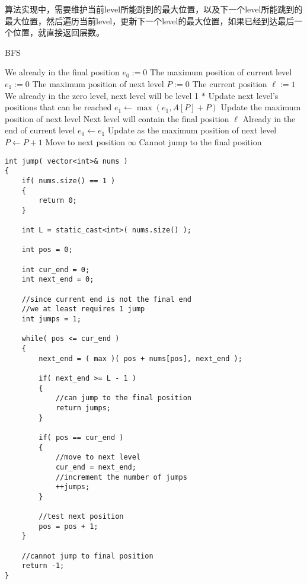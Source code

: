 算法实现中，需要维护当前level所能跳到的最大位置，以及下一个level所能跳到的最大位置，然后遍历当前level，更新下一个level的最大位置，如果已经到达最后一个位置，就直接返回层数。

\setcounter{algorithm}{0}
\begin{algorithm}[H]
\caption{BFS}
\begin{algorithmic}[1]
\State {} \Comment We already in the final position
\EndIf
\State $e_0 := 0$ \Comment The maximum position of current level
\State $e_1 := 0$ \Comment The maximum position of next level
\State $P:=0$ \Comment The current position
\State $\ell := 1$ \Comment We already in the zero level, next level will be level 1
\State $\ast$ Update next level's positions that can be reached
\State $e_1 \gets \max(e_1, A[P]+P)$ \Comment Update the maximum position of next level
 \Comment Next level will contain the final position
\State \Return $\ell$
\EndIf
{} \Comment Already in the end of current level
\State $e_0 \gets e_1$ \Comment Update as the maximum position of next level
\EndIf
\State $P \gets P+1$ \Comment Move to next position
\EndWhile
\State \Return $\infty$ \Comment Cannot jump to the final position
\EndProcedure
\end{algorithmic}
\end{algorithm}

\setcounter{lstlisting}{0}
\begin{lstlisting}[style=customc, caption={BFS}]
int jump( vector<int>& nums )
{
    if( nums.size() == 1 )
    {
        return 0;
    }

    int L = static_cast<int>( nums.size() );

    int pos = 0;

    int cur_end = 0;
    int next_end = 0;

    //since current end is not the final end
    //we at least requires 1 jump
    int jumps = 1;

    while( pos <= cur_end )
    {
        next_end = ( max )( pos + nums[pos], next_end );

        if( next_end >= L - 1 )
        {
            //can jump to the final position
            return jumps;
        }

        if( pos == cur_end )
        {
            //move to next level
            cur_end = next_end;
            //increment the number of jumps
            ++jumps;
        }

        //test next position
        pos = pos + 1;
    }

    //cannot jump to final position
    return -1;
}
\end{lstlisting}